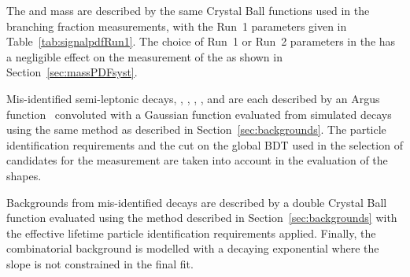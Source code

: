 
The \bsmumu and \bdmumu mass \pdfs are described by the same Crystal Ball functions used in the branching fraction measurements, with the Run~1 parameters given in Table~\ref{tab:signalpdfRun1}. %
The choice of Run~1 or Run~2 parameters in the \pdf has a negligible effect on the measurement of the \bsmumu \el as shown in Section~\ref{sec:massPDFsyst}.

Mis-identified semi-leptonic decays, \lambdab, \bdpimunu, \bsKmunu, \bupimumu, \bdpimumu and \bcjpsimunu are each described by an Argus function~\cite{Argus_pdf} convoluted with a Gaussian function evaluated from simulated decays using the same method as described in Section~\ref{sec:backgrounds}. The particle identification requirements and the cut on the global BDT used in the selection of candidates for the \el measurement are taken into account in the evaluation of the \pdf shapes. %

Backgrounds from mis-identified \bhh decays are described by a double Crystal Ball function evaluated using the method described in Section~\ref{sec:backgrounds} with the effective lifetime particle identification requirements applied. Finally, the combinatorial background is modelled with a decaying exponential where the slope is not constrained in the final fit.



